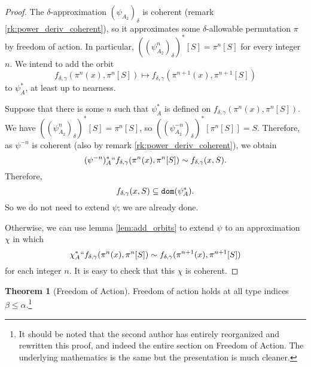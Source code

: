 \documentclass[112pt]{article}
\theoremstyle{definition}
\newtheorem{theorem}{Theorem}[section]
\theoremstyle{remark}
\begin{document}
\begin{proof}
  The $\delta$-approximation $(\psi_{A_2})_\delta$ is coherent (remark \ref{rk:power_deriv_coherent}), so it approximates some $\delta$-allowable permutation $\pi$ by freedom of action.
  In particular, $((\psi_{A_2}^n)_\delta)^*[S] = \pi^n[S]$ for every integer $n$.
  We intend to add the orbit
  $$ f_{\delta,\gamma}(\pi^n(x), \pi^n[S]) \mapsto f_{\delta,\gamma}(\pi^{n+1}(x), \pi^{n+1}[S]) $$
  to $\psi_A^*$, at least up to nearness.

  Suppose that there is some $n$ such that $\psi_A^*$ is defined on $f_{\delta,\gamma}(\pi^n(x), \pi^n[S])$.
  We have $((\psi_{A_2}^n)_\delta)^*[S] = \pi^n[S]$, so $((\psi_{A_2}^{-n})_\delta)^*[\pi^n[S]] = S$.
  Therefore, as $\psi^{-n}$ is coherent (also by remark \ref{rk:power_deriv_coherent}), we obtain
  $$ (\psi^{-n})_A^* `` f_{\delta,\gamma}(\pi^n(x), \pi^n[S]) \sim f_{\delta,\gamma}(x, S). $$
  Therefore,
  $$ f_{\delta,\gamma}(x, S) \subseteq {\tt dom}(\psi_A^*).$$
  So we do not need to extend $\psi$; we are already done.

  Otherwise, we can use lemma \ref{lem:add_orbits} to extend $\psi$ to an approximation $\chi$ in which
  $$ \chi_A^* `` f_{\delta,\gamma}(\pi^n(x), \pi^n[S]) \sim f_{\delta,\gamma}(\pi^{n+1}(x), \pi^{n+1}[S]) $$
  for each integer $n$.
  It is easy to check that this $\chi$ is coherent.
\end{proof}
\begin{theorem}[Freedom of Action]\label{thm:foa}
  Freedom of action holds at all type indices $\beta \leq \alpha$.\footnote{It should be noted that the second author has entirely reorganized and rewritten this proof, and indeed the entire section on Freedom of Action.  The underlying mathematics is the same but the presentation is much cleaner.}
\end{theorem}
\end{document}
